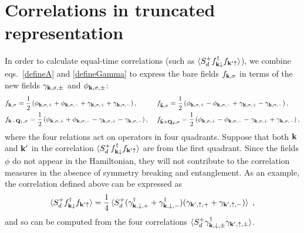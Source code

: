 \documentclass[%
reprint,
superscriptaddress,
groupedaddress,
superscriptaddress,
onecolumn,
10pt
]{revtex4-2}
\begin{document}
\section{Correlations in truncated representation}
In order to calculate equal-time correlations (such as \(\braket{S_d^+ f^\dagger_{{\bf k}\downarrow}f_{{\bf k}^\prime \uparrow}} \)), we combine eqs.~\ref{defineA} and \ref{defineGamma} to express the bare fields \(f_{{\bf k},\sigma}\) in terms of the new fields \(\gamma_{{\bf k},\sigma,\pm}\) and \(\phi_{{\bf k},\sigma,\pm}\):
\begin{equation}\begin{aligned}
	&f_{{\bf k},\sigma} = \frac{1}{2}\left(\phi_{{\bf k},\sigma,+} + \phi_{{\bf k},\sigma,-} + \gamma_{{\bf k},\sigma,+} + \gamma_{{\bf k},\sigma,-}\right), ~ &&f_{{\bf \bar k},\sigma} = \frac{1}{2}\left(\phi_{{\bf k},\sigma,+} - \phi_{{\bf k},\sigma,-} + \gamma_{{\bf k},\sigma,+} - \gamma_{{\bf k},\sigma,-}\right),\\
	&f_{{\bf k} - {\bf Q}_1,\sigma} = \frac{1}{2}\left(\phi_{{\bf k},\sigma,+} + \phi_{{\bf k},\sigma,-} - \gamma_{{\bf k},\sigma,+} - \gamma_{{\bf k},\sigma,-}\right),~ &&f_{{\bf \bar k} + {\bf Q}_2,\sigma} = \frac{1}{2}\left(\phi_{{\bf k},\sigma,+} - \phi_{{\bf k},\sigma,-} - \gamma_{{\bf k},\sigma,+} + \gamma_{{\bf k},\sigma,-}\right),
\end{aligned}\end{equation}
where the four relations act on operators in four quadrants. Suppose that both \({\bf k}\) and \({\bf k}^\prime\) in the correlation \(\braket{S_d^+ f^\dagger_{{\bf k}\downarrow}f_{{\bf k}^\prime \uparrow}}\) are from the first quadrant. Since the fields \(\phi\) do not appear in the Hamiltonian, they will not contribute to the correlation measures in the absence of symmetry breaking and entanglement. As an example, the correlation defined above can be expressed as
\begin{equation}\begin{aligned}
	\braket{S_d^+ f^\dagger_{{\bf k}\downarrow}f_{{\bf k}^\prime \uparrow}} = \frac{1}{4}\braket{S_d^+ (\gamma^\dagger_{{\bf k},\downarrow,+} + \gamma^\dagger_{{\bf k},\downarrow,-})(\gamma_{{\bf k}^\prime,\uparrow,+} + \gamma_{{\bf k}^\prime,\uparrow,-})}~,
\end{aligned}\end{equation}
and so can be computed from the four correlations \(\braket{S_d^+ \gamma^\dagger_{{\bf k},\downarrow,\pm} \gamma_{{\bf k}^\prime,\uparrow,\pm}}\).
\end{document}
